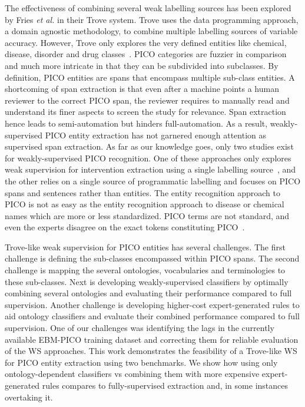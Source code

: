 \documentclass[10.7pt,]{article}
\begin{document}
The effectiveness of combining several weak labelling sources has been explored by Fries \textit{et al.} in their Trove system.
Trove uses the data programming approach, a domain agnostic methodology, to combine multiple labelling sources of variable accuracy.
However, Trove only explores the very defined entities like chemical, disease, disorder and drug classes~\cite{fries2021ontology}. 
PICO categories are fuzzier in comparison and much more intricate in that they can be subdivided into subclasses.
By definition, PICO entities are spans that encompass multiple sub-class entities.
A shortcoming of span extraction is that even after a machine points a human reviewer to the correct PICO span, the reviewer requires to manually read and understand its finer aspects to screen the study for relevance.
Span extraction hence leads to semi-automation but hinders full-automation.
As a result, weakly-supervised PICO entity extraction has not garnered enough attention as supervised span extraction.
As far as our knowledge goes, only two studies exist for weakly-supervised PICO recognition.
One of these approaches only explores weak supervision for intervention extraction using a single labelling source~\cite{dhrangadhariya2022distant}, and the other relies on a single source of programmatic labelling and focuses on PICO spans and sentences rather than entities.
The entity recognition approach to PICO is not as easy as the entity recognition approach to disease or chemical names which are more or less standardized.
PICO terms are not standard, and even the experts disagree on the exact tokens constituting PICO~\cite{brockmeier2019improving}.


Trove-like weak supervision for PICO entities has several challenges.
The first challenge is defining the sub-classes encompassed within PICO spans.
The second challenge is mapping the several ontologies, vocabularies and terminologies to these sub-classes.
Next is developing weakly-supervised classifiers by optimally combining several ontologies and evaluating their performance compared to full supervision.
Another challenge is developing higher-cost expert-generated rules to aid ontology classifiers and evaluate their combined performance compared to full supervision.
One of our challenges was identifying the lags in the currently available EBM-PICO training dataset and correcting them for reliable evaluation of the WS approaches.
This work demonstrates the feasibility of a Trove-like WS for PICO entity extraction using two benchmarks.
We show how using only ontology-dependent classifiers vs combining them with more expensive expert-generated rules compares to fully-supervised extraction and, in some instances overtaking it.
%
%
%
\end{document}
